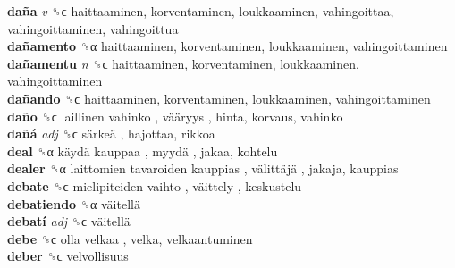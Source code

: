 \textbf{daña} \emph{v}  ␝ϲ  haittaaminen, korventaminen, loukkaaminen, vahingoittaa, vahingoittaminen, vahingoittua  \\
\textbf{dañamento} ␝α  haittaaminen, korventaminen, loukkaaminen, vahingoittaminen  \\
\textbf{dañamentu} \emph{n}  ␝ϲ  haittaaminen, korventaminen, loukkaaminen, vahingoittaminen  \\
\textbf{dañando} ␝ϲ  haittaaminen, korventaminen, loukkaaminen, vahingoittaminen  \\
\textbf{daño} ␝ϲ   laillinen vahinko ,  vääryys , hinta, korvaus, vahinko  \\
\textbf{dañá} \emph{adj}  ␝ϲ   särkeä , hajottaa, rikkoa  \\
\textbf{deal} ␝α   käydä kauppaa ,  myydä , jakaa, kohtelu  \\
\textbf{dealer} ␝α   laittomien tavaroiden kauppias ,  välittäjä , jakaja, kauppias  \\
\textbf{debate} ␝ϲ   mielipiteiden vaihto ,  väittely , keskustelu  \\
\textbf{debatiendo} ␝α   väitellä   \\
\textbf{debatí} \emph{adj}  ␝ϲ   väitellä   \\
\textbf{debe} ␝ϲ   olla velkaa , velka, velkaantuminen  \\
\textbf{deber} ␝ϲ  velvollisuus  \\
